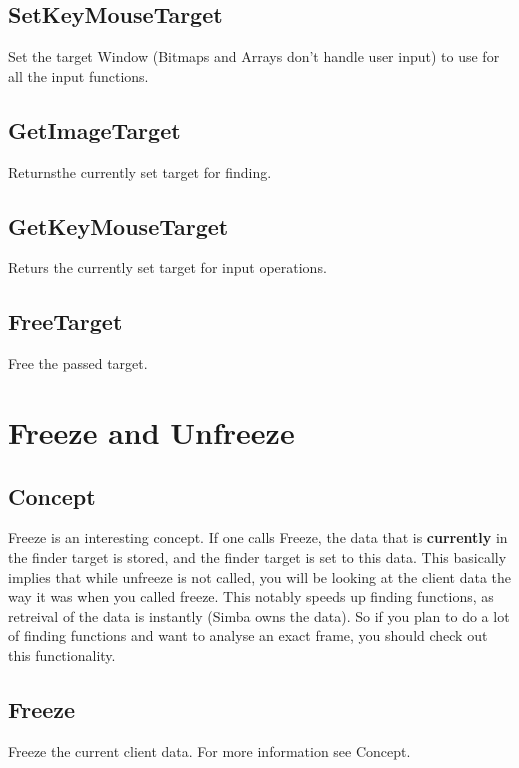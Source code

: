 \documentclass[a4paper]{report}
\begin{document}
\subsection{SetKeyMouseTarget}

Set the target Window (Bitmaps and Arrays don't handle user input) to use for
all the input functions.

\subsection{GetImageTarget}

Returnsthe currently set target for finding.

\subsection{GetKeyMouseTarget}

Returs the currently set target for input operations.

\subsection{FreeTarget}

Free the passed target.

\section{Freeze and Unfreeze}

\subsection{Concept}

Freeze is an interesting concept. If one calls Freeze, the data that is
\textbf{currently} in the finder target is stored, and the finder target is set
to this data. This basically implies that while unfreeze is not called, you will
be looking at the client data the way it was when you called freeze. This
notably speeds up finding functions, as retreival of the data is instantly
(Simba owns the data). So if you plan to do a lot of finding functions and want
to analyse an exact frame, you should check out this functionality.

\subsection{Freeze}

Freeze the current client data. For more information see Concept.
\end{document}
